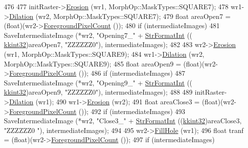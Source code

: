 \begin{DoxyCode}
476 
477   initRaster->\hyperlink{class_k_k_b_1_1_raster_a5a019718e60c06c4262e8127232ff19c}{Erosion} (wr1, MorphOp::MaskTypes::SQUARE7);
478   wr1->\hyperlink{class_k_k_b_1_1_raster_afb263b7cc4ab60bf6745c5166173bbb9}{Dilation} (wr2, MorphOp::MaskTypes::SQUARE7);
479   \textcolor{keywordtype}{float}  areaOpen7 = (float)(wr2->\hyperlink{class_k_k_b_1_1_raster_a38425a410e40696276be4f22de702eb6}{ForegroundPixelCount} ());
480   \textcolor{keywordflow}{if}  (intermediateImages)
481     SaveIntermediateImage (*wr2, \textcolor{stringliteral}{"Opening7\_"} + \hyperlink{namespace_k_k_b_ae3bde258fa036604fac8bdb0277ab46e}{StrFormatInt} ((
      \hyperlink{namespace_k_k_b_a8fa4952cc84fda1de4bec1fbdd8d5b1b}{kkint32})areaOpen7, \textcolor{stringliteral}{"ZZZZZZ0"}), intermediateImages);
482   
483   wr2->\hyperlink{class_k_k_b_1_1_raster_a5a019718e60c06c4262e8127232ff19c}{Erosion} (wr1, MorphOp::MaskTypes::SQUARE9);
484   wr1->\hyperlink{class_k_k_b_1_1_raster_afb263b7cc4ab60bf6745c5166173bbb9}{Dilation} (wr2, MorphOp::MaskTypes::SQUARE9);
485   \textcolor{keywordtype}{float}  areaOpen9 = (float)(wr2->\hyperlink{class_k_k_b_1_1_raster_a38425a410e40696276be4f22de702eb6}{ForegroundPixelCount} ());
486   \textcolor{keywordflow}{if}  (intermediateImages)
487     SaveIntermediateImage (*wr2, \textcolor{stringliteral}{"Opening9\_"} + \hyperlink{namespace_k_k_b_ae3bde258fa036604fac8bdb0277ab46e}{StrFormatInt} ((
      \hyperlink{namespace_k_k_b_a8fa4952cc84fda1de4bec1fbdd8d5b1b}{kkint32})areaOpen9, \textcolor{stringliteral}{"ZZZZZZ0"}), intermediateImages);
488 
489   initRaster->\hyperlink{class_k_k_b_1_1_raster_afb263b7cc4ab60bf6745c5166173bbb9}{Dilation} (wr1);
490   wr1->\hyperlink{class_k_k_b_1_1_raster_a5a019718e60c06c4262e8127232ff19c}{Erosion} (wr2);
491   \textcolor{keywordtype}{float}  areaClose3 = (float)(wr2->\hyperlink{class_k_k_b_1_1_raster_a38425a410e40696276be4f22de702eb6}{ForegroundPixelCount} ());
492   \textcolor{keywordflow}{if}  (intermediateImages)
493     SaveIntermediateImage (*wr2, \textcolor{stringliteral}{"Close3\_"} + \hyperlink{namespace_k_k_b_ae3bde258fa036604fac8bdb0277ab46e}{StrFormatInt} ((\hyperlink{namespace_k_k_b_a8fa4952cc84fda1de4bec1fbdd8d5b1b}{kkint32})areaClose3, \textcolor{stringliteral}{"ZZZZZZ0
      "}), intermediateImages);
494 
495   wr2->\hyperlink{class_k_k_b_1_1_raster_a617d427bb2b7094a9d012e63036a66d8}{FillHole} (wr1);
496   \textcolor{keywordtype}{float}  tranf = (float)(wr2->\hyperlink{class_k_k_b_1_1_raster_a38425a410e40696276be4f22de702eb6}{ForegroundPixelCount} ());
497   \textcolor{keywordflow}{if}  (intermediateImages)

\end{DoxyCode}
